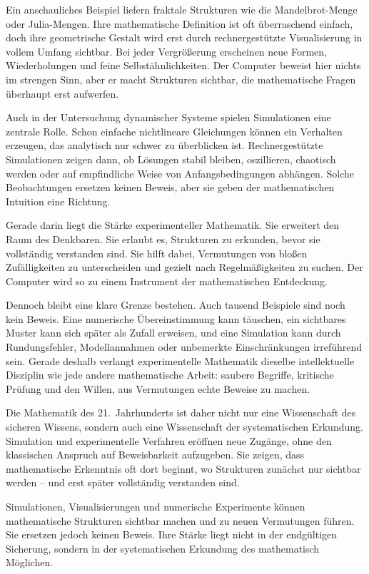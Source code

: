 Ein anschauliches Beispiel liefern fraktale Strukturen wie die Mandelbrot-Menge oder Julia-Mengen. Ihre mathematische Definition ist oft überraschend einfach, doch ihre geometrische Gestalt wird erst durch rechnergestützte Visualisierung in vollem Umfang sichtbar. Bei jeder Vergrößerung erscheinen neue Formen, Wiederholungen und feine Selbstähnlichkeiten. Der Computer beweist hier nichts im strengen Sinn, aber er macht Strukturen sichtbar, die mathematische Fragen überhaupt erst aufwerfen.

Auch in der Untersuchung dynamischer Systeme spielen Simulationen eine zentrale Rolle. Schon einfache nichtlineare Gleichungen können ein Verhalten erzeugen, das analytisch nur schwer zu überblicken ist. Rechnergestützte Simulationen zeigen dann, ob Lösungen stabil bleiben, oszillieren, chaotisch werden oder auf empfindliche Weise von Anfangsbedingungen abhängen. Solche Beobachtungen ersetzen keinen Beweis, aber sie geben der mathematischen Intuition eine Richtung.

Gerade darin liegt die Stärke experimenteller Mathematik. Sie erweitert den Raum des Denkbaren. Sie erlaubt es, Strukturen zu erkunden, bevor sie vollständig verstanden sind. Sie hilft dabei, Vermutungen von bloßen Zufälligkeiten zu unterscheiden und gezielt nach Regelmäßigkeiten zu suchen. Der Computer wird so zu einem Instrument der mathematischen Entdeckung.

Dennoch bleibt eine klare Grenze bestehen. Auch tausend Beispiele sind noch kein Beweis. Eine numerische Übereinstimmung kann täuschen, ein sichtbares Muster kann sich später als Zufall erweisen, und eine Simulation kann durch Rundungsfehler, Modellannahmen oder unbemerkte Einschränkungen irreführend sein. Gerade deshalb verlangt experimentelle Mathematik dieselbe intellektuelle Disziplin wie jede andere mathematische Arbeit: saubere Begriffe, kritische Prüfung und den Willen, aus Vermutungen echte Beweise zu machen.

Die Mathematik des 21.~Jahrhunderts ist daher nicht nur eine Wissenschaft des sicheren Wissens, sondern auch eine Wissenschaft der systematischen Erkundung. Simulation und experimentelle Verfahren eröffnen neue Zugänge, ohne den klassischen Anspruch auf Beweisbarkeit aufzugeben. Sie zeigen, dass mathematische Erkenntnis oft dort beginnt, wo Strukturen zunächst nur sichtbar werden -- und erst später vollständig verstanden sind.

\begin{DidacticBox}
	\label{box:experimentelle-mathematik}
	Simulationen, Visualisierungen und numerische Experimente können mathematische Strukturen sichtbar machen und zu neuen Vermutungen führen. Sie ersetzen jedoch keinen Beweis. Ihre Stärke liegt nicht in der endgültigen Sicherung, sondern in der systematischen Erkundung des mathematisch Möglichen.
\end{DidacticBox}

